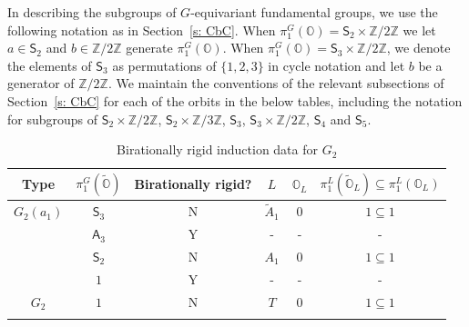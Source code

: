 \documentclass[11pt]{amsart}
\renewcommand{\O}{{\mathbb O}}
\newcommand{\bZ}{{\mathbb Z}}
\newcommand{\Alt}{{\mathsf{A}}}
\newcommand{\Sym}{{\mathsf{S}}}
\newcommand{\covO}{\widetilde{\O}}
\numberwithin{equation}{section}
\begin{document}
	In describing the subgroups of $G$-equivariant fundamental groups, we use the following notation as in Section~\ref{s: CbC}. When $\pi_1^G(\O)=\Sym_2\times \bZ/2\bZ$ we let $a\in \Sym_2$ and $b\in\bZ/2\bZ$ generate $\pi_1^G(\O)$. When $\pi_1^G(\O)=\Sym_3\times \bZ/2\bZ$, we denote the elements of $\Sym_3$ as permutations of $\{1,2,3\}$ in cycle notation and let $b$ be a generator of $\bZ/2\bZ$. We maintain the conventions of the relevant subsections of Section~\ref{s: CbC} for each of the orbits in the below tables, including the notation for subgroups of $\Sym_2\times\bZ/2\bZ$, $\Sym_2\times\bZ/3\bZ$, $\Sym_3$, $\Sym_3\times \bZ/2\bZ$, $\Sym_4$ and $\Sym_5$.
 
	
	\renewcommand{\arraystretch}{2}
	\begin{center}
		\begin{longtable}{|c|c|c|c|c|c|}
			\hline
			Type & $\pi_1^G(\covO)$ & Birationally rigid? & $L$ & $\O_L$ & $\pi_1^L(\covO_L)\subseteq \pi_1^L(\O_L)$\\ \hline
			\hline
			$G_2(a_1)$ & $\Sym_3$ & N & $\widetilde{A}_1$ & $0$ & $1\subseteq1$ \\
			
			& $\Alt_3$ & Y & - & - & - \\
			
			& $\Sym_2$ & N & $A_1$ & $0$ & $1\subseteq 1$ \\
			& $1$ & Y & - & - & - \\
			\hline 
			$G_2$ & $1$ & N & $T$ & $0$ & $1\subseteq 1$  \\
			\hline
			\caption{Birationally rigid induction data for $G_2$}\label{ta: G2}
		\end{longtable}
	\end{center}
	
\end{document}
